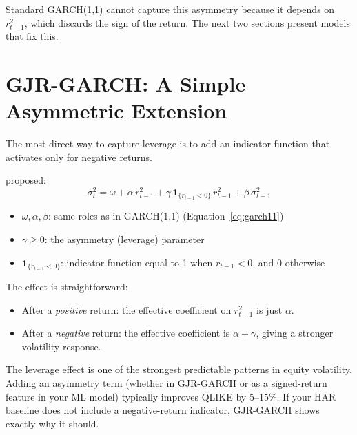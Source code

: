 Standard GARCH(1,1) cannot capture this asymmetry because it depends on $r^2_{t-1}$,
which discards the sign of the return. The next two sections present models that fix
this.


\section{GJR-GARCH: A Simple Asymmetric Extension}
\label{sec:gjr}

The most direct way to capture leverage is to add an indicator function that
activates only for negative returns.

\citet{gjr1993} proposed:
%
\begin{equation}
\label{eq:gjr}
\sigma^2_t = \omega + \alpha \, r^2_{t-1}
  + \gamma \, \mathbf{1}_{\{r_{t-1} < 0\}} \, r^2_{t-1}
  + \beta \, \sigma^2_{t-1}
\end{equation}
%
\begin{itemize}[nosep]
  \item $\omega, \alpha, \beta$: same roles as in GARCH(1,1)
        (Equation~\ref{eq:garch11})
  \item $\gamma \geq 0$: the asymmetry (leverage) parameter
  \item $\mathbf{1}_{\{r_{t-1} < 0\}}$: indicator function equal to 1 when
        $r_{t-1} < 0$, and 0 otherwise
\end{itemize}

The effect is straightforward:
\begin{itemize}[nosep]
  \item After a \emph{positive} return: the effective coefficient on $r^2_{t-1}$ is
        just $\alpha$.
  \item After a \emph{negative} return: the effective coefficient is
        $\alpha + \gamma$, giving a stronger volatility response.
\end{itemize}

\begin{projectconnection}
The leverage effect is one of the strongest predictable patterns in equity volatility.
Adding an asymmetry term (whether in GJR-GARCH or as a signed-return feature in your
ML model) typically improves QLIKE by 5--15\%. If your HAR baseline does not include
a negative-return indicator, GJR-GARCH shows exactly why it should.
\end{projectconnection}

